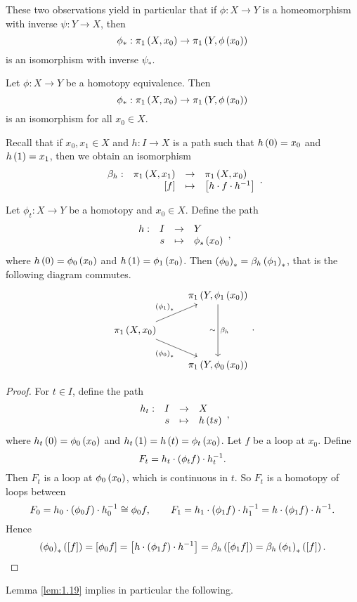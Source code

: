 These two observations yield in particular that if $ \phi : X \to Y $ is a homeomorphism with inverse $ \psi : Y \to X $, then
$$ \phi_* : \pi_1\left( X, x_0 \right) \to \pi_1\left( Y, \phi\left( x_0 \right) \right) $$
is an isomorphism with inverse $ \psi_* $.


\begin{proposition}
\label{prop:1.18}
Let $ \phi : X \to Y $ be a homotopy equivalence. Then
$$ \phi_* : \pi_1\left( X, x_0 \right) \to \pi_1\left( Y, \phi\left( x_0 \right) \right) $$
is an isomorphism for all $ x_0 \in X $.
\end{proposition}

Recall that if $ x_0, x_1 \in X $ and $ h : I \to X $ is a path such that $ h\left( 0 \right) = x_0 $ and $ h\left( 1 \right) = x_1 $, then we obtain an isomorphism
$$ \function[\beta_h]{\pi_1\rb{X, x_1}}{\pi_1\rb{X, x_0}}{\sb{f}}{\sb{h \cdot f \cdot h^{-1}}}. $$

\begin{lemma}
\label{lem:1.19}
Let $ \phi_t : X \to Y $ be a homotopy and $ x_0 \in X $. Define the path
$$ \function[h]{I}{Y}{s}{\phi_s\rb{x_0}}, $$
where $ h\left( 0 \right) = \phi_0\left( x_0 \right) $ and $ h\left( 1 \right) = \phi_1\left( x_0 \right) $. Then $ \left( \phi_0 \right)_* = \beta_h\left( \phi_1 \right)_* $, that is the following diagram commutes.
$$
\begin{tikzcd}
& \pi_1\rb{Y, \phi_1\rb{x_0}} \arrow{dd}{\beta_h}[swap]{\sim} \\
\pi_1\rb{X, x_0} \arrow{ur}{\rb{\phi_1}_*} \arrow[swap]{dr}{\rb{\phi_0}_*} & \\
& \pi_1\rb{Y, \phi_0\rb{x_0}}
\end{tikzcd}.
$$
\end{lemma}

\begin{proof}
For $ t \in I $, define the path
$$ \function[h_t]{I}{X}{s}{h\rb{ts}}, $$
where $ h_t\left( 0 \right) = \phi_0\left( x_0 \right) $ and $ h_t\left( 1 \right) = h\left( t \right) = \phi_t\left( x_0 \right) $. Let $ f $ be a loop at $ x_0 $. Define
$$ F_t = h_t \cdot \left( \phi_tf \right) \cdot h_t^{-1}. $$
Then $ F_t $ is a loop at $ \phi_0\left( x_0 \right) $, which is continuous in $ t $. So $ F_t $ is a homotopy of loops between
$$ F_0 = h_0 \cdot \left( \phi_0f \right) \cdot h_0^{-1} \cong \phi_0f, \qquad F_1 = h_1 \cdot \left( \phi_1f \right) \cdot h_1^{-1} = h \cdot \left( \phi_1f \right) \cdot h^{-1}. $$
Hence
$$ \left( \phi_0 \right)_*\left( \left[ f \right] \right) = \left[ \phi_0f \right] = \left[ h \cdot \left( \phi_1f \right) \cdot h^{-1} \right] = \beta_h\left( \left[ \phi_1f \right] \right) = \beta_h\left( \phi_1 \right)_*\left( \left[ f \right] \right). $$
\end{proof}

Lemma \ref{lem:1.19} implies in particular the following.

